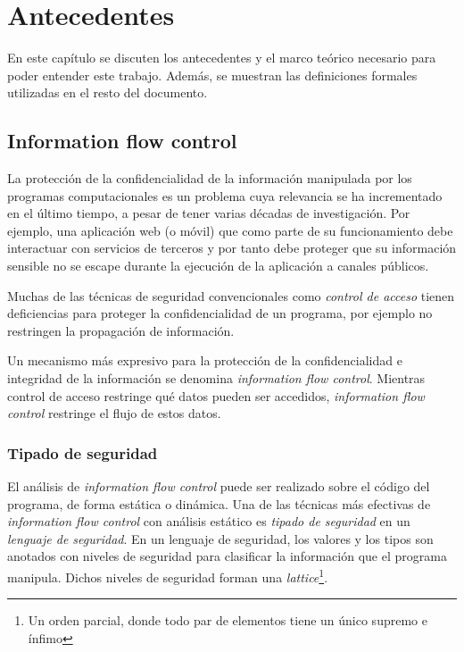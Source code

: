 \chapter{Antecedentes}

En este capítulo se discuten los antecedentes y el marco teórico necesario para poder entender este trabajo. Además, se muestran las definiciones formales utilizadas en el resto del documento.

\section{Information flow control}

	La protección de la confidencialidad de la información manipulada por los programas computacionales es un problema cuya relevancia se ha incrementado en el último tiempo, a pesar de tener varias décadas de investigación. Por ejemplo, una aplicación web (o móvil) que como parte de su funcionamiento debe interactuar con servicios de terceros y por tanto debe proteger que su información sensible no se escape durante la ejecución de la aplicación a canales públicos.

	Muchas de las técnicas de seguridad convencionales como \textit{control de acceso} tienen deficiencias para proteger la confidencialidad de un programa, por ejemplo no restringen la propagación de información\cite{myers-phd}.%

	Un mecanismo más expresivo para la protección de la confidencialidad e integridad de la información se denomina \textit{information flow control}. Mientras control de acceso restringe qué datos pueden ser accedidos, \textit{information flow control} restringe el flujo de estos datos.

	\subsection{Tipado de seguridad}
	El análisis de \textit{information flow control} puede ser realizado sobre el código del programa, de forma estática o dinámica. Una de las técnicas más efectivas de \textit{information flow control} con análisis estático es \textit{tipado de seguridad} en un \textit{lenguaje de seguridad}. En un lenguaje de seguridad, los valores y los tipos son anotados con niveles de seguridad para clasificar la información que el programa manipula. Dichos niveles de seguridad forman una \textit{lattice}\footnote{Un orden parcial, donde todo par de elementos tiene un único supremo e ínfimo}.

